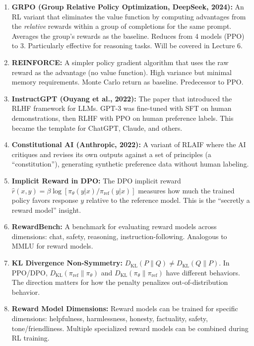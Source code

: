 \documentclass[11pt, a4paper]{article}
\begin{document}
\begin{enumerate}[leftmargin=2em]
  \item \textbf{GRPO (Group Relative Policy Optimization, DeepSeek, 2024):} An RL variant that eliminates the value function by computing advantages from the \emph{relative} rewards within a group of completions for the same prompt. Averages the group's rewards as the baseline. Reduces from 4 models (PPO) to 3. Particularly effective for reasoning tasks. Will be covered in Lecture 6.

  \item \textbf{REINFORCE:} A simpler policy gradient algorithm that uses the raw reward as the advantage (no value function). High variance but minimal memory requirements. Monte Carlo return as baseline. Predecessor to PPO.

  \item \textbf{InstructGPT (Ouyang et al., 2022):} The paper that introduced the RLHF framework for LLMs. GPT-3 was fine-tuned with SFT on human demonstrations, then RLHF with PPO on human preference labels. This became the template for ChatGPT, Claude, and others.

  \item \textbf{Constitutional AI (Anthropic, 2022):} A variant of RLAIF where the AI critiques and revises its own outputs against a set of principles (a ``constitution''), generating synthetic preference data without human labeling.

  \item \textbf{Implicit Reward in DPO:} The DPO implicit reward $\hat{r}(x,y) = \beta \log [\pi_\theta(y|x) / \pi_{\text{ref}}(y|x)]$ measures how much the trained policy favors response $y$ relative to the reference model. This is the ``secretly a reward model'' insight.

  \item \textbf{RewardBench:} A benchmark for evaluating reward models across dimensions: chat, safety, reasoning, instruction-following. Analogous to MMLU for reward models.

  \item \textbf{KL Divergence Non-Symmetry:} $D_{\text{KL}}(P \| Q) \neq D_{\text{KL}}(Q \| P)$. In PPO/DPO, $D_{\text{KL}}(\pi_{\text{ref}} \| \pi_\theta)$ and $D_{\text{KL}}(\pi_\theta \| \pi_{\text{ref}})$ have different behaviors. The direction matters for how the penalty penalizes out-of-distribution behavior.

  \item \textbf{Reward Model Dimensions:} Reward models can be trained for specific dimensions: helpfulness, harmlessness, honesty, factuality, safety, tone/friendliness. Multiple specialized reward models can be combined during RL training.


\end{enumerate}
\end{document}
